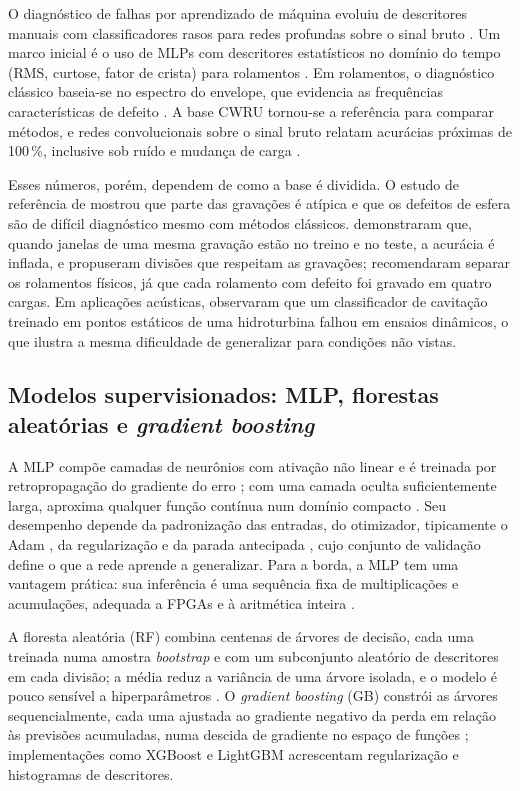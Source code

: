 \documentclass[12pt]{article}
\begin{document}
O diagnóstico de falhas por aprendizado de máquina evoluiu de descritores manuais com classificadores rasos para redes profundas sobre o sinal bruto \cite{lei2020}. Um marco inicial é o uso de MLPs com descritores estatísticos no domínio do tempo (RMS, curtose, fator de crista) para rolamentos \cite{samanta2003}. Em rolamentos, o diagnóstico clássico baseia-se no espectro do envelope, que evidencia as frequências características de defeito \cite{randall2011}. A base CWRU \cite{cwru} tornou-se a referência para comparar métodos, e redes convolucionais sobre o sinal bruto relatam acurácias próximas de 100\,\%, inclusive sob ruído e mudança de carga \cite{zhang2017,zhang2018}.

Esses números, porém, dependem de como a base é dividida. O estudo de referência de \cite{smith2015} mostrou que parte das gravações é atípica e que os defeitos de esfera são de difícil diagnóstico mesmo com métodos clássicos. \cite{rauber2021} demonstraram que, quando janelas de uma mesma gravação estão no treino e no teste, a acurácia é inflada, e propuseram divisões que respeitam as gravações; \cite{hendriks2022} recomendaram separar os rolamentos físicos, já que cada rolamento com defeito foi gravado em quatro cargas. Em aplicações acústicas, \cite{amini2022} observaram que um classificador de cavitação treinado em pontos estáticos de uma hidroturbina falhou em ensaios dinâmicos, o que ilustra a mesma dificuldade de generalizar para condições não vistas.

\subsection{Modelos supervisionados: MLP, florestas aleatórias e \textit{gradient boosting}}
\label{subsec:rev_modelos}

A MLP compõe camadas de neurônios com ativação não linear e é treinada por retropropagação do gradiente do erro \cite{rumelhart1986}; com uma camada oculta suficientemente larga, aproxima qualquer função contínua num domínio compacto \cite{hornik1989}. Seu desempenho depende da padronização das entradas, do otimizador, tipicamente o Adam \cite{kingma2015}, da regularização e da parada antecipada \cite{prechelt1998}, cujo conjunto de validação define o que a rede aprende a generalizar. Para a borda, a MLP tem uma vantagem prática: sua inferência é uma sequência fixa de multiplicações e acumulações, adequada a FPGAs e à aritmética inteira \cite{duarte2018,jacob2018}.

A floresta aleatória (RF) combina centenas de árvores de decisão, cada uma treinada numa amostra \textit{bootstrap} e com um subconjunto aleatório de descritores em cada divisão; a média reduz a variância de uma árvore isolada, e o modelo é pouco sensível a hiperparâmetros \cite{breiman2001}. O \textit{gradient boosting} (GB) constrói as árvores sequencialmente, cada uma ajustada ao gradiente negativo da perda em relação às previsões acumuladas, numa descida de gradiente no espaço de funções \cite{friedman2001}; implementações como XGBoost \cite{chen2016} e LightGBM \cite{ke2017} acrescentam regularização e histogramas de descritores.
\end{document}
